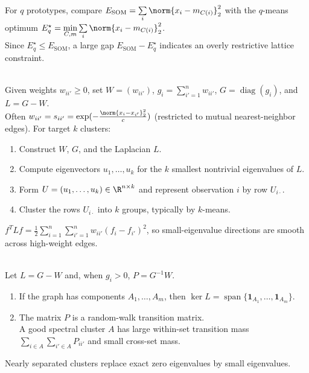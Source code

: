 \begin{remark} \label{rem:sl-som-reconstruction-check} \\
For $q$ prototypes, compare $E_{\mathrm{SOM}}=\sum\limits_i\norm{x_i-m_{C(i)}}_2^2$ with the $q$-means optimum $E_q^\star=\min\limits_{C,m}\sum\limits_i\norm{x_i-m_{C(i)}}_2^2$.\\
Since $E_q^\star\leq E_{\mathrm{SOM}}$, a large gap $E_{\mathrm{SOM}}-E_q^\star$ indicates an overly restrictive lattice constraint.
\end{remark}

\begin{method} \label{meth:sl-spectral-clustering} \\
Given weights $w_{ii'}\geq0$, set $W=(w_{ii'})$, $g_i=\sum\limits_{i'=1}^n w_{ii'}$, $G=\operatorname{diag}(g_i)$, and $L=G-W$.\\
Often $w_{ii'}=s_{ii'}=\exp(-\frac{\norm{x_i-x_{i'}}_2^2}{c})$ (restricted to mutual nearest-neighbor edges). For target $k$ clusters:
\begin{enumerate}[label=(\roman*)]
\setlength{\itemsep}{0pt}
\item Construct $W$, $G$, and the Laplacian $L$.
\item Compute eigenvectors $u_1,\ldots,u_k$ for the $k$ smallest nontrivial eigenvalues of $L$.
\item Form $U=(u_1,\ldots,u_k)\in\R^{n\times k}$ and represent observation $i$ by row $U_{i\cdot}$.
\item Cluster the rows $U_{i\cdot}$ into $k$ groups, typically by $k$-means.
\end{enumerate}
$f^TLf=\frac{1}{2}\sum\limits_{i=1}^n\sum\limits_{i'=1}^n w_{ii'}(f_i-f_{i'})^2$, so small-eigenvalue directions are smooth across high-weight edges.
\end{method}

\begin{remark} \label{rem:sl-spectral-clustering-random-walk-view} \\
Let $L=G-W$ and, when $g_i>0$, $P=G^{-1}W$.
\begin{enumerate}[label=(\roman*)]
\setlength{\itemsep}{0pt}
\item If the graph has components $A_1,\ldots,A_m$, then $\ker L=\operatorname{span}\{\mathbf{1}_{A_1},\ldots,\mathbf{1}_{A_m}\}$.
\item The matrix $P$ is a random-walk transition matrix.\\
A good spectral cluster $A$ has large within-set transition mass $\sum\limits_{i\in A}\sum\limits_{i'\in A}P_{ii'}$ and small cross-set mass.
\end{enumerate}
Nearly separated clusters replace exact zero eigenvalues by small eigenvalues.
\end{remark}


